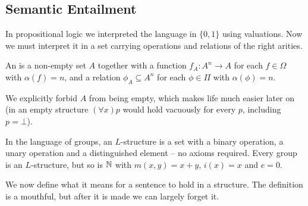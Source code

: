 \documentclass[a4paper]{scrartcl}
\begin{document}
\subsection{Semantic Entailment}

In propositional logic we interpreted the language in $\{0, 1\}$ using valuations. Now we must interpret it in a set carrying operations and relations of the right arities.

\begin{definition}[Structure]
  An  is a non-empty set $A$ together with a function $f_A: A^n \rightarrow A$ for each $f \in \Omega$ with $\alpha(f) = n$, and a relation $\phi_A \subseteq A^n$ for each $\phi \in \Pi$ with $\alpha(\phi) = n$.
\end{definition}

\begin{remark}
  We explicitly forbid $A$ from being empty, which makes life much easier later on (in an empty structure $(\forall x)p$ would hold vacuously for every $p$, including $p = \bot$).
\end{remark}

\begin{example}
  In the language of groups, an $L$-structure is a set with a binary operation, a unary operation and a distinguished element -- no axioms required. Every group is an $L$-structure, but so is $\mathbb{N}$ with $m(x,y) = x + y$, $i(x) = x$ and $e = 0$.
\end{example}

We now define what it means for a sentence to hold in a structure. The definition is a mouthful, but after it is made we can largely forget it.
\end{document}
